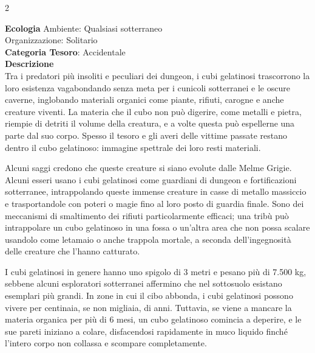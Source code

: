 \begin{multicols}{2}
{\textbf{Ecologia}
Ambiente: Qualsiasi sotterraneo\\
Organizzazione: Solitario\\
\textbf{Categoria Tesoro}: Accidentale\\
\textbf{Descrizione}\\
Tra i predatori più insoliti e peculiari dei dungeon, i cubi gelatinosi trascorrono la loro esistenza vagabondando senza meta per i cunicoli sotterranei e le oscure caverne, inglobando materiali organici come piante, rifiuti, carogne e anche creature viventi. La materia che il cubo non può digerire, come metalli e pietra, riempie di detriti il volume della creatura, e a volte questa può espellerne una parte dal suo corpo. Spesso il tesoro e gli averi delle vittime passate restano dentro il cubo gelatinoso: immagine spettrale dei loro resti materiali.

Alcuni saggi credono che queste creature si siano evolute dalle Melme Grigie. Alcuni esseri usano i cubi gelatinosi come guardiani di dungeon e fortificazioni sotterranee, intrappolando queste immense creature in casse di metallo massiccio e trasportandole con poteri o magie fino al loro posto di guardia finale. Sono dei meccanismi di smaltimento dei rifiuti particolarmente efficaci; una tribù può intrappolare un cubo gelatinoso in una fossa o un'altra area che non possa scalare usandolo come letamaio o anche trappola mortale, a seconda dell'ingegnosità delle creature che l'hanno catturato.

I cubi gelatinosi in genere hanno uno spigolo di 3 metri e pesano più di 7.500 kg, sebbene alcuni esploratori sotterranei affermino che nel sottosuolo esistano esemplari più grandi. In zone in cui il cibo abbonda, i cubi gelatinosi possono vivere per centinaia, se non migliaia, di anni. Tuttavia, se viene a mancare la materia organica per più di 6 mesi, un cubo gelatinoso comincia a deperire, e le sue pareti iniziano a colare, disfacendosi rapidamente in muco liquido finché l'intero corpo non collassa e scompare completamente.

}
\end{multicols}
